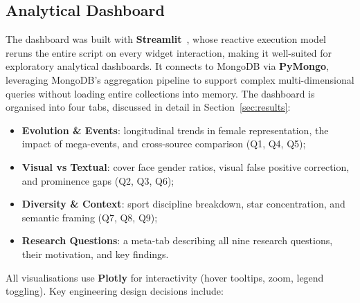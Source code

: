 \documentclass[11pt,a4paper]{article}
\begin{document}
\subsection{Analytical Dashboard}
\label{sec:dashboard}

The dashboard was built with \textbf{Streamlit}~\cite{Streamlit2024}, whose reactive execution model reruns the entire script on every widget interaction, making it well-suited for exploratory analytical dashboards. It connects to MongoDB via \textbf{PyMongo}, leveraging MongoDB's aggregation pipeline to support complex multi-dimensional queries without loading entire collections into memory. The dashboard is organised into four tabs, discussed in detail in Section~\ref{sec:results}:
\begin{itemize}[itemsep=1pt]
  \item \textbf{Evolution \& Events}: longitudinal trends in female representation, the impact of mega-events, and cross-source comparison (Q1, Q4, Q5);
  \item \textbf{Visual vs Textual}: cover face gender ratios, visual false positive correction, and prominence gaps (Q2, Q3, Q6);
  \item \textbf{Diversity \& Context}: sport discipline breakdown, star concentration, and semantic framing (Q7, Q8, Q9);
  \item \textbf{Research Questions}: a meta-tab describing all nine research questions, their motivation, and key findings.
\end{itemize}
All visualisations use \textbf{Plotly} for interactivity (hover tooltips, zoom, legend toggling). Key engineering design decisions include:
\end{document}
